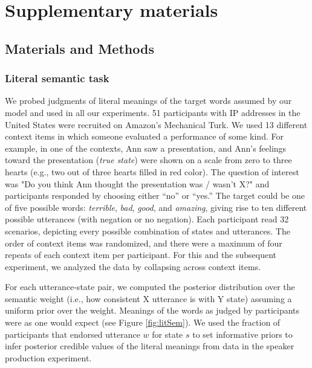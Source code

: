 \documentclass[12pt]{article}
\newcommand{\ejy}[1]{\textcolor{Red}{[ejy: #1]}}
\begin{document}

\section*{Supplementary materials}


\subsection*{Materials and Methods}

\subsubsection*{Literal semantic task}

We probed judgments of literal meanings of the target words assumed by our model and used in all our experiments. 
51 participants with IP addresses in the United States were recruited on Amazon's Mechanical Turk. 
We used 13 different context items in which someone evaluated a performance of some kind. 
For example, in one of the contexts, Ann saw a presentation, and Ann's feelings toward the presentation (\emph{true state}) were shown on a scale from zero to three hearts 
(e.g., two out of three hearts filled in red color). 
The question of interest was "Do you think Ann thought the presentation was / wasn't X?" and participants responded by choosing either \enquote{no} or \enquote{yes.}  
The target could be one of five possible words: \emph{terrible}, \emph{bad}, \emph{good}, and \emph{amazing}, giving rise to ten different possible utterances (with negation or no negation). 
Each participant read 32 scenarios, depicting every possible combination of states and utterances. 
The order of context items was randomized, and there were a maximum of four repeats of each context item per participant. 
For this and the subsequent experiment, we analyzed the data by collapsing across context items. 

For each utterance-state pair, we computed the posterior distribution over the semantic weight 
(i.e., how consistent X utterance is with Y state) assuming a uniform prior over the weight.
Meanings of the words as judged by participants were as one would expect (see Figure \ref{fig:litSem}). 
We used the fraction of participants that endorsed utterance $w$ for state $s$ to set informative priors to infer posterior credible values of the literal meanings from data in the speaker production experiment.
\end{document}
